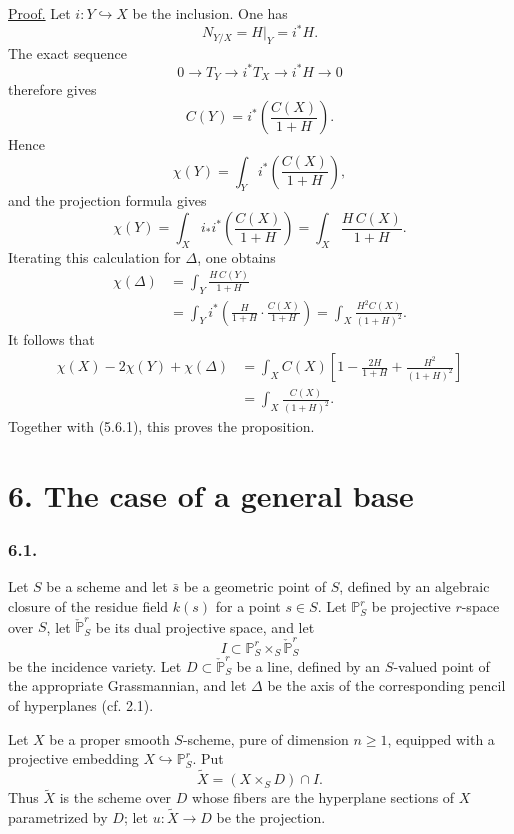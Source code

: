 \noindent\underline{Proof.}
Let $i:Y\hookrightarrow X$ be the inclusion.  One has
\[
N_{Y/X}=H|_Y=i^*H.
\]
The exact sequence
\[
0\longrightarrow T_Y
\longrightarrow i^*T_X
\longrightarrow i^*H
\longrightarrow0
\]
therefore gives
\begin{equation}\tag{5.7.4}
C(Y)=i^*\!\left(\frac{C(X)}{1+H}\right).
\end{equation}
Hence
\[
\chi(Y)=\int_Yi^*\!\left(\frac{C(X)}{1+H}\right),
\]
and the projection formula gives
\begin{equation}\tag{5.7.5}
\chi(Y)
=\int_Xi_*i^*\!\left(\frac{C(X)}{1+H}\right)
=\int_X\frac{H\,C(X)}{1+H}.
\end{equation}
Iterating this calculation for $\Delta$, one obtains
\begin{equation}\tag{5.7.6}
\begin{aligned}
\chi(\Delta)
&=\int_Y\frac{H\,C(Y)}{1+H}\\
&=\int_Yi^*\!\left(
  \frac{H}{1+H}\cdot\frac{C(X)}{1+H}
  \right)
=\int_X\frac{H^2C(X)}{(1+H)^2}.
\end{aligned}
\end{equation}
It follows that
\[
\begin{aligned}
\chi(X)-2\chi(Y)+\chi(\Delta)
&=\int_XC(X)\left[
1-\frac{2H}{1+H}+\frac{H^2}{(1+H)^2}
\right]\\
&=\int_X\frac{C(X)}{(1+H)^2}.
\end{aligned}
\]
Together with (5.6.1), this proves the proposition.

\section*{6. The case of a general base}

\subsubsection*{6.1.}
Let $S$ be a scheme and let $\bar s$ be a geometric point of $S$,
defined by an algebraic closure of the residue field $k(s)$ for a
point $s\in S$.  Let $\mathbb P^r_S$ be projective $r$-space over
$S$, let $\check{\mathbb P}^{r}_S$ be its dual projective space, and
let
\[
I\subset\mathbb P^r_S\times_S\check{\mathbb P}^{r}_S
\]
be the incidence variety.  Let
$D\subset\check{\mathbb P}^{r}_S$ be a line, defined by an
$S$-valued point of the appropriate Grassmannian, and let $\Delta$ be
the axis of the corresponding pencil of hyperplanes (cf. 2.1).

Let $X$ be a proper smooth $S$-scheme, pure of dimension $n\geq1$,
equipped with a projective embedding $X\hookrightarrow\mathbb P^r_S$.
Put
\[
\widetilde X=(X\times_SD)\cap I.
\]
Thus $\widetilde X$ is the scheme over $D$ whose fibers are the
hyperplane sections of $X$ parametrized by $D$; let
$u:\widetilde X\to D$ be the projection.

